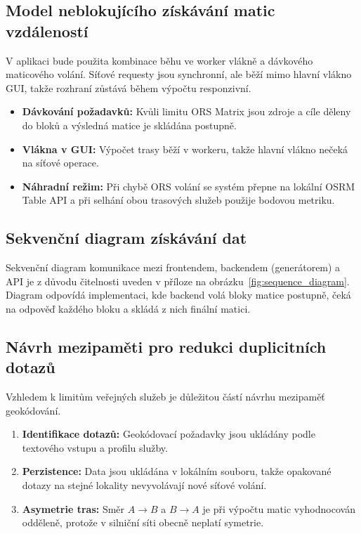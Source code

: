 \subsection{Model neblokujícího získávání matic vzdáleností}
V aplikaci bude použita kombinace běhu ve worker vlákně a dávkového maticového volání. Síťové requesty jsou synchronní, ale běží mimo hlavní vlákno GUI, takže rozhraní zůstává během výpočtu responzivní.

\begin{itemize}
    \item \textbf{Dávkování požadavků:} Kvůli limitu ORS Matrix jsou zdroje a cíle děleny do bloků a výsledná matice je skládána postupně.
    \item \textbf{Vlákna v GUI:} Výpočet trasy běží v workeru, takže hlavní vlákno nečeká na síťové operace.
    \item \textbf{Náhradní režim:} Při chybě ORS volání se systém přepne na lokální OSRM Table API a při selhání obou trasových služeb použije bodovou metriku.
\end{itemize}

\subsection{Sekvenční diagram získávání dat}
Sekvenční diagram komunikace mezi frontendem, backendem (generátorem) a API je z důvodu čitelnosti uveden v příloze na obrázku~\ref{fig:sequence_diagram}. Diagram odpovídá implementaci, kde backend volá bloky matice postupně, čeká na odpověď každého bloku a skládá z nich finální matici.
\subsection{Návrh mezipaměti pro redukci duplicitních dotazů}
Vzhledem k limitům veřejných služeb je důležitou částí návrhu mezipaměť geokódování. 

\begin{enumerate}
    \item \textbf{Identifikace dotazů:} Geokódovací požadavky jsou ukládány podle textového vstupu a profilu služby.
    \item \textbf{Perzistence:} Data jsou ukládána v lokálním souboru, takže opakované dotazy na stejné lokality nevyvolávají nové síťové volání.
    \item \textbf{Asymetrie tras:} Směr $A \to B$ a $B \to A$ je při výpočtu matic vyhodnocován odděleně, protože v silniční síti obecně neplatí symetrie.
\end{enumerate}


